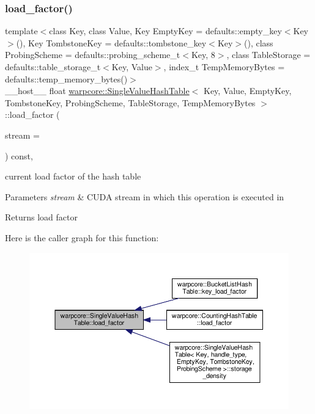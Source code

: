 \subsubsection{\texorpdfstring{load\+\_\+factor()}{load\_factor()}}
{\footnotesize\ttfamily template$<$class Key, class Value, Key Empty\+Key = defaults\+::empty\+\_\+key$<$\+Key$>$(), Key Tombstone\+Key = defaults\+::tombstone\+\_\+key$<$\+Key$>$(), class Probing\+Scheme = defaults\+::probing\+\_\+scheme\+\_\+t$<$\+Key, 8$>$, class Table\+Storage = defaults\+::table\+\_\+storage\+\_\+t$<$\+Key, Value$>$, index\+\_\+t Temp\+Memory\+Bytes = defaults\+::temp\+\_\+memory\+\_\+bytes()$>$ \\
\+\_\+\+\_\+host\+\_\+\+\_\+ float \hyperlink{classwarpcore_1_1SingleValueHashTable}{warpcore\+::\+Single\+Value\+Hash\+Table}$<$ Key, Value, Empty\+Key, Tombstone\+Key, Probing\+Scheme, Table\+Storage, Temp\+Memory\+Bytes $>$\+::load\+\_\+factor (\begin{DoxyParamCaption}\item[{const cuda\+Stream\+\_\+t}]{stream = {} }\end{DoxyParamCaption}) const\hspace{0.3cm}{\ttfamily [inline]}, {\ttfamily [noexcept]}}



current load factor of the hash table 


\begin{DoxyParams}{Parameters}
{\em stream} & C\+U\+DA stream in which this operation is executed in \\
\hline
\end{DoxyParams}
\begin{DoxyReturn}{Returns}
load factor 
\end{DoxyReturn}
Here is the caller graph for this function\+:
\nopagebreak
\begin{figure}[H]
\begin{center}
\leavevmode
\includegraphics[width=350pt]{classwarpcore_1_1SingleValueHashTable_ad16e25026a5ac0b064249d520299c086_icgraph}
\end{center}
\end{figure}
\mbox{\label{classwarpcore_1_1SingleValueHashTable_aeb3d8cabf825ff16453be9bfb1556085}} 
